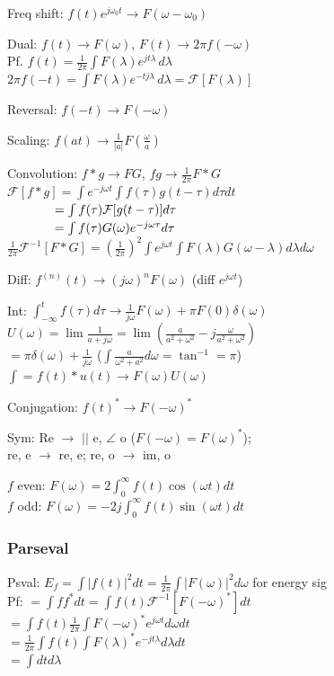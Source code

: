 \documentclass[4pt]{article}
\theoremstyle{definition}
\theoremstyle{definition}
\renewcommand{\o}{\omega}
\newcommand{\ra}{\rightarrow}
\begin{document}
\begin{landscape}
\begin{multicols}{3}
    Freq shift: \(f(t) e^{j\omega_0 t} \ra F(\omega - \omega_0)\)  %

    Dual: \(f(t) \ra F(\omega)\), \(F(t) \ra 2\pi f(-\omega)\)\\ 
    Pf. \(f(t) = \frac 1 {2\pi} \int F(\lambda) e^{jt\lambda}\, d\lambda\)\\
    \(2\pi f(-t) = \int F(\lambda) e^{-tj\lambda}\, d\lambda = \mathcal{F}[F(\lambda)]\)

    Reversal: \(f(-t)\ra F(-\o)\)

    Scaling: \(f(at)\ra \frac{1}{|a|}F(\frac{\o}{a})\)   %

    Convolution: \(f*g \ra FG\), \(fg \ra \frac{1}{2\pi} F*G\)\\
    \(\mathcal F[f*g] = \int e^{-j\o t} \int f(\tau) g(t-\tau)d\tau dt\)\\
    \(\hspace{3.75em}=\int f(\tau) \mathcal F[g(t-\tau)]  d\tau \)\\
    \(\hspace{3.75em}= \int f(\tau) G(\o)e^{-j\o\tau}d\tau\)
    \( \frac{1}{2\pi} \mathcal{F}^{-1}[F * G] = (\frac{1}{2\pi})^2 \int e^{j\o t} \int F(\lambda) G(\o - \lambda) d\lambda d\o\)

    Diff: \(f^{(n)}(t) \ra (j\o)^nF(\o)\) (diff $e^{j\o t}$)    %
    
    Int: \(\int_{-\infty}^t f(\tau)d\tau \ra \frac{1}{j\o}F(\o) + \pi F(0) \delta(\o)\)\\
    \(U(\o) = \lim \frac{1}{a+j\o} = \lim (\frac{a}{a^2+\o^2} - j\frac{\o}{a^2+\o^2}) \) \\
    \(= \pi\delta(\o) + \frac{1}{j\o}\) ($\int \frac{a}{\o^2+a^2}d\o = \tan^{-1}=\pi$)\\
    $\int = f(t) * u(t) \ra F(\o)U(\o)$

    Conjugation: \(f(t)^* \ra F(-\o)^*\)   %

    Sym: Re $\ra$ $||$ e, $\angle$ o ($F(-\o) = F(\o)^*$);\\
    re, e $\ra$ re, e; re, o $\ra$ im, o

    $f$ even: \(F(\o) = 2\int_0^{\infty} f(t)\cos(\o t) dt\)\\
    $f$ odd: \(F(\o) = -2j\int_0^{\infty} f(t) \sin(\o t) dt\)
\newpage
\subsubsection*{Parseval}
    Psval: \(E_f = \int |f(t)|^2 dt = \frac{1}{2\pi} \int |F(\omega)|^2 d\o\)  for energy sig\\  %
    Pf: \(= \int f f^* dt = \int f(t)\mathcal F ^{-1}[F(-\o)^*]dt\)\\
    \(= \int f(t) \frac{1}{2\pi} \int F(-\o)^* e^{j\o t} d\o dt\)\\
    \(= \frac{1}{2\pi}\int f(t) \int F(\lambda)^* e^{-jt\lambda} d\lambda dt \)\\
    \(= \int dt d\lambda\)


\end{multicols}
\end{landscape}
\end{document}
